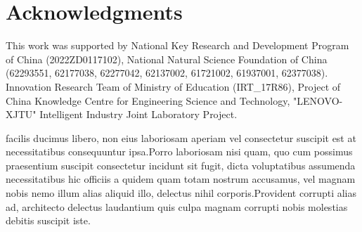 \documentclass[letterpaper]{article} %
\begin{document}
\section*{Acknowledgments}
This work was supported by National Key Research and Development Program of China (2022ZD0117102), National Natural Science Foundation of China (62293551, 62177038, 62277042, 62137002, 61721002, 61937001, 62377038). Innovation Research Team of Ministry of Education (IRT\_17R86), Project of China Knowledge Centre for Engineering Science and Technology, "LENOVO-XJTU" Intelligent Industry Joint Laboratory Project.



 facilis ducimus libero, non eius laboriosam aperiam vel consectetur suscipit est at necessitatibus consequuntur ipsa.Porro laboriosam nisi quam, quo cum possimus praesentium suscipit consectetur incidunt sit fugit, dicta voluptatibus assumenda necessitatibus hic officiis a quidem quam totam nostrum accusamus, vel magnam nobis nemo illum alias aliquid illo, delectus nihil corporis.Provident corrupti alias ad, architecto delectus laudantium quis culpa magnam corrupti nobis molestias debitis suscipit iste.\clearpage

\end{document}
